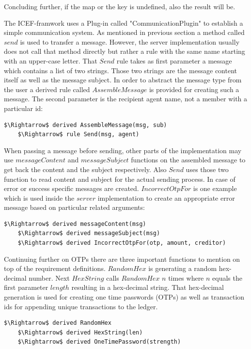 Concluding further, if the map or the key is undefined, also the result will be.

The ICEF-framwork uses a Plug-in called "CommunicationPlugin" to establish a simple communication system. As mentioned in previous section a method called $send$ is used to transfer a message. However, the server implementation usually does not call that method directly but rather a rule with the same name starting with an upper-case letter. That $Send$ rule takes as first parameter a message which contains a list of two strings. Those two strings are the message content itself as well as the message subject. In order to abstract the message type from the user a derived rule called $AssembleMessage$ is provided for creating such a message. The second parameter is the recipient agent name, not a member with a particular id:

\begin{lstlisting}[language=bsl,mathescape=true]
	$\Rightarrow$ derived AssembleMessage(msg, sub)	
	$\Rightarrow$ rule Send(msg, agent)
\end{lstlisting}

When passing a message before sending, other parts of the implementation may use $messageContent$ and $messageSubject$ functions on the assembled message to get back the content and the subject respectively. Also $Send$ uses those two function to read content and subject for the actual sending process.
In case of error or success specific messages are created. $IncorrectOtpFor$ is one example which is used inside the $server$ implementation to create an appropriate error message based on particular related arguments:

\begin{lstlisting}[language=bsl,mathescape=true]
	$\Rightarrow$ derived messageContent(msg)
	$\Rightarrow$ derived messageSubject(msg)
	$\Rightarrow$ derived IncorrectOtpFor(otp, amount, creditor)
\end{lstlisting}

Continuing further on OTPs there are three important functions to mention on top of the requirement definitions. $RandomHex$ is generating a random hex-decimal number. Next $HexString$ calls $RandomHex$ $n$ times where $n$ equals the first parameter $length$ resulting in a hex-decimal string. That hex-decimal generation is used for creating one time passwords (OTPs) as well as transaction ids for appending unique transactions to the ledger.

\begin{lstlisting}[language=bsl,mathescape=true]
	$\Rightarrow$ derived RandomHex
	$\Rightarrow$ derived HexString(len)
	$\Rightarrow$ derived OneTimePassword(strength)
\end{lstlisting}

